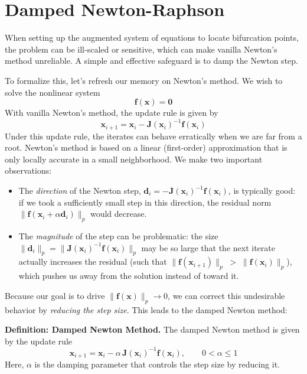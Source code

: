 

\section{Damped Newton-Raphson}
When setting up the augmented system of equations to locate bifurcation points, the problem can be ill-scaled or sensitive, which can make vanilla Newton's method unreliable. A simple and effective safeguard is to damp the Newton step.

To formalize this, let's refresh our memory on Newton's method. We wish to solve the nonlinear system 
\[
\mathbf{f}(\mathbf{x})=\mathbf{0}
\]
With vanilla Newton's method, the update rule is given by
\[
\mathbf{x}_{i+1}=\mathbf{x}_i-\mathbf{J}(\mathbf{x}_i)^{-1}\mathbf{f}(\mathbf{x}_i)
\]
Under this update rule, the iterates can behave erratically when we are far from a root. Newton's method is based on a linear (first-order) approximation that is only locally accurate in a small neighborhood. We make two important observations:
\begin{itemize}
  \item The \emph{direction} of the Newton step, 
  \(\mathbf{d}_i=-\mathbf{J}(\mathbf{x}_i)^{-1}\mathbf{f}(\mathbf{x}_i)\), is typically good: if we took a sufficiently small step in this direction, the residual norm 
  \(\lVert \mathbf{f}(\mathbf{x}_i+\alpha \mathbf{d}_i)\rVert_p\) 
  would decrease.
  \item The \emph{magnitude} of the step can be problematic: the size 
  \(\lVert \mathbf{d}_i\rVert_p=\lVert \mathbf{J}(\mathbf{x}_i)^{-1}\mathbf{f}(\mathbf{x}_i)\rVert_p\) 
  may be so large that the next iterate actually increases the residual (such that \( \lVert \mathbf{f}(\mathbf{x}_{i+1})\rVert_p \;>\; \lVert \mathbf{f}(\mathbf{x}_i)\rVert_p \)), which pushes us away from the solution instead of toward it.
\end{itemize}
Because our goal is to drive \(\lVert \mathbf{f}(\mathbf{x})\rVert_p \to 0\), we can correct this undesirable behavior by \emph{reducing the step size}. This leads to the damped Newton method:
\begin{definitionBox}
    \textbf{Definition: Damped Newton Method.}
    The damped Newton method is given by the update rule
    \begin{equation}
    \mathbf{x}_{i+1}=\mathbf{x}_i-\alpha\,\mathbf{J}(\mathbf{x}_i)^{-1}\mathbf{f}(\mathbf{x}_i),\qquad 0<\alpha\le 1
    \end{equation}
    Here, $\alpha$ is the damping parameter that controls the step size by reducing it.
\end{definitionBox}

